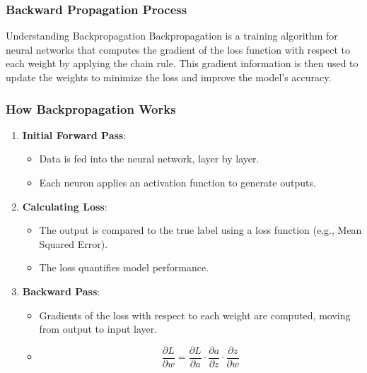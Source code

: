 \documentclass[aspectratio=169]{beamer}
\begin{document}
\begin{frame}[fragile]
    \frametitle{Backward Propagation Process}
    \begin{block}{Understanding Backpropagation}
        Backpropagation is a training algorithm for neural networks that computes the gradient of the loss function with respect to each weight by applying the chain rule. This gradient information is then used to update the weights to minimize the loss and improve the model's accuracy.
    \end{block}
\end{frame}

\begin{frame}[fragile]
    \frametitle{How Backpropagation Works}
    \begin{enumerate}
        \item \textbf{Initial Forward Pass}:
        \begin{itemize}
            \item Data is fed into the neural network, layer by layer.
            \item Each neuron applies an activation function to generate outputs.
        \end{itemize}
        
        \item \textbf{Calculating Loss}:
        \begin{itemize}
            \item The output is compared to the true label using a loss function (e.g., Mean Squared Error).
            \item The loss quantifies model performance.
        \end{itemize}
        
        \item \textbf{Backward Pass}:
        \begin{itemize}
            \item Gradients of the loss with respect to each weight are computed, moving from output to input layer.
            \item \begin{equation}
                \frac{\partial L}{\partial w} = \frac{\partial L}{\partial a} \cdot \frac{\partial a}{\partial z} \cdot \frac{\partial z}{\partial w}
            \end{equation}
        \end{itemize}
    \end{enumerate}
\end{frame}
\end{document}
